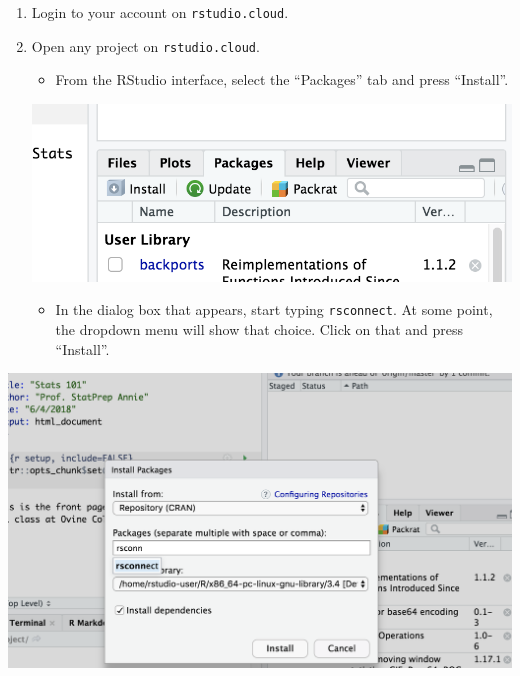 \documentclass[]{book}
\providecommand{\tightlist}{%
  \setlength{\itemsep}{0pt}\setlength{\parskip}{0pt}}
\theoremstyle{definition}
\theoremstyle{definition}
\theoremstyle{definition}
\theoremstyle{remark}
\begin{document}
\begin{enumerate}
\def\labelenumi{\arabic{enumi}.}
\tightlist
\item
  Login to your account on \texttt{rstudio.cloud}.
\item
  Open any project on \texttt{rstudio.cloud}.

  \begin{itemize}
  \tightlist
  \item
    From the RStudio interface, select the ``Packages'' tab and press
    ``Install''.
  \end{itemize}

  \begin{center}\includegraphics{images/annie-install-rsconnect1} \end{center}

  \begin{itemize}
  \tightlist
  \item
    In the dialog box that appears, start typing \texttt{rsconnect}. At
    some point, the dropdown menu will show that choice. Click on that
    and press ``Install''.
  \end{itemize}
\end{enumerate}

\begin{center}\includegraphics{images/annie-install-rsconnect2} \end{center}
\end{document}
